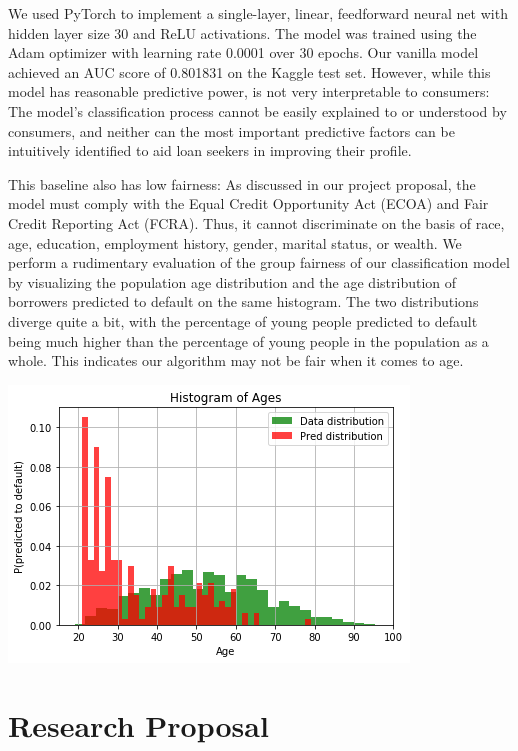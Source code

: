 \documentclass[11pt, margin=1in]{article}
\begin{document}
We used PyTorch to implement a single-layer, linear, feedforward neural net with hidden layer size 30 and ReLU activations. The model was trained using the Adam optimizer with learning rate 0.0001 over 30 epochs. Our vanilla model achieved an AUC score of 0.801831 on the Kaggle test set. However, while this model has reasonable predictive power, is not very interpretable to consumers: The model's classification process cannot be easily explained to or understood by consumers, and neither can the most important predictive factors can be
intuitively identified to aid loan seekers in improving their profile. 

This baseline also has low fairness: As discussed in our project proposal, the model must comply with the Equal Credit Opportunity Act (ECOA) and Fair Credit Reporting Act (FCRA). Thus, it cannot discriminate on the basis of race, age, education, employment history, gender, marital status, or wealth. We perform a rudimentary evaluation of the group fairness of our classification model by visualizing the population age distribution and the age distribution of borrowers predicted to default on the same histogram. The two distributions diverge quite a bit, with the percentage of young people predicted to default being much higher than the percentage of young people in the population as a whole. This indicates our algorithm may not be fair when it comes to age.

\begin{center}
	\includegraphics[width=0.9\linewidth]{age-fairness}
\end{center}

\section{Research Proposal}
\end{document}
